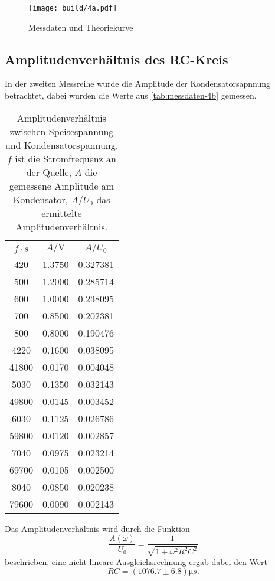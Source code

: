\begin{figure}[H]
	\centering
	\texttt{[image: build/4a.pdf]}
	\caption{Messdaten und Theoriekurve}
	\label{fig:plot-4a}
\end{figure}


\subsection{Amplitudenverhältnis des RC-Kreis}
\label{sec:4b-auswertung}
In der zweiten Messreihe wurde die Amplitude der Kondensatorsapnnung betrachtet, dabei 
wurden die Werte aus \autoref{tab:messdaten-4b} gemessen.

\begin{table}
	\centering
	\caption{Amplitudenverhältnis zwischen Speisespannung und Kondensatorspannung.
	$f$ ist die Stromfrequenz an der Quelle, $A$ die gemessene Amplitude am 
	Kondensator, $A/U_0$ das ermittelte Amplitudenverhältnis.}
	\label{tab:messdaten-4b}
	\begin{tabular}{c c c}
		\toprule
		$f \cdot \si{s}$ & $A / \si{\volt}$  & $A / U_0$ \\
		\midrule
		 420   & 1.3750  & 0.327381 \\
	         500  & 1.2000  & 0.285714 \\
	         600  & 1.0000  & 0.238095 \\
	         700  & 0.8500  & 0.202381 \\
	         800  & 0.8000  & 0.190476 \\
	        4220  & 0.1600  & 0.038095 \\
	       41800  & 0.0170  & 0.004048 \\
	        5030  & 0.1350  & 0.032143 \\
	       49800  & 0.0145  & 0.003452 \\
	        6030  & 0.1125  & 0.026786 \\
	       59800  & 0.0120  & 0.002857 \\
	        7040  & 0.0975  & 0.023214 \\
	       69700  & 0.0105  & 0.002500 \\
	        8040  & 0.0850  & 0.020238 \\
	       79600  & 0.0090  & 0.002143 \\
		\bottomrule
	\end{tabular}
\end{table}

Das Amplitudenverhältnis wird durch die Funktion
\begin{equation}
	\frac{A(\omega)}{U_0}
	=
	\frac{1}{\sqrt{1 + \omega^2 R^2 C^2}}
\end{equation}
beschrieben, eine nicht lineare Ausgleichsrechnung ergab dabei den Wert
\begin{equation}
	RC = (1076.7 \pm 6.8) \si{\micro s}.
	\label{eqn:ergebnis-4b}
\end{equation}

